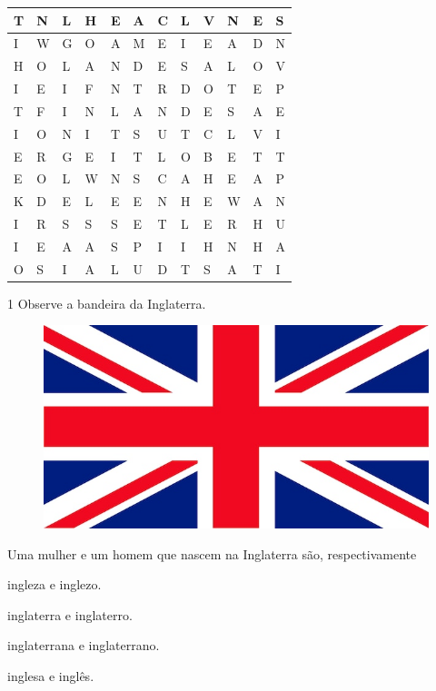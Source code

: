 \begin{minipage}{.5\textwidth}
\begin{longtable}[]{@{}llllllllllll@{}}
\toprule
T & N & L & H & E & A & C & L & V & N & E & S\tabularnewline
\midrule
\endhead
I & W & G & O & A & M & E & I & E & A & D & N\tabularnewline
H & O & L & A & N & D & E & S & A & L & O & V\tabularnewline
I & E & I & F & N & T & R & D & O & T & E & P\tabularnewline
T & F & I & N & L & A & N & D & E & S & A & E\tabularnewline
I & O & N & I & T & S & U & T & C & L & V & I\tabularnewline
E & R & G & E & I & T & L & O & B & E & T & T\tabularnewline
E & O & L & W & N & S & C & A & H & E & A & P\tabularnewline
K & D & E & L & E & E & N & H & E & W & A & N\tabularnewline
I & R & S & S & S & E & T & L & E & R & H & U\tabularnewline
I & E & A & A & S & P & I & I & H & N & H & A\tabularnewline
O & S & I & A & L & U & D & T & S & A & T & I\tabularnewline
\bottomrule
\end{longtable}
\end{minipage}\hspace{3cm}
\begin{minipage}{.3\textwidth}
\end{minipage}


\num{1} Observe a bandeira da Inglaterra. %


\begin{figure}[htpb!]
\centering
\includegraphics[width=.5\textwidth]{media/image6.jpeg}
\end{figure}

Uma mulher e um homem que nascem na Inglaterra são, respectivamente

\begin{multicols}{2}
\begin{escolha}
\item ingleza e inglezo.

\item inglaterra e inglaterro.

\item inglaterrana e inglaterrano.

\item inglesa e inglês.
\end{escolha}
\end{multicols}

